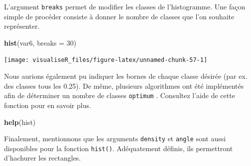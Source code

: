 \documentclass[]{article}
\newenvironment{Shaded}{\begin{snugshade}}{\end{snugshade}}
\newcommand{\CommentTok}[1]{\textcolor[rgb]{0.56,0.35,0.01}{\textit{#1}}}
\newcommand{\DataTypeTok}[1]{\textcolor[rgb]{0.13,0.29,0.53}{#1}}
\newcommand{\DecValTok}[1]{\textcolor[rgb]{0.00,0.00,0.81}{#1}}
\newcommand{\KeywordTok}[1]{\textcolor[rgb]{0.13,0.29,0.53}{\textbf{#1}}}
\newcommand{\NormalTok}[1]{#1}
\newcommand{\OtherTok}[1]{\textcolor[rgb]{0.56,0.35,0.01}{#1}}
\begin{document}
\begin{Shaded}
\end{Shaded}

L'argument \texttt{breaks} permet de modifier les classes de l'histogramme. Une façon
simple de procéder consiste à donner le nombre de classes que l'on souhaite
représenter.

\begin{Shaded}
\begin{Highlighting}[]
\KeywordTok{hist}\NormalTok{(var6, }\DataTypeTok{breaks =} \DecValTok{30}\NormalTok{)}
\end{Highlighting}
\end{Shaded}

\begin{center}\texttt{[image: visualiseR\_files/figure-latex/unnamed-chunk-57-1]} \end{center}

Nous aurions également pu indiquer les bornes de chaque classe désirée (par ex.
des classes tous les 0.25). De même, plusieurs algorithmes ont été implémentés
afin de déterminer un nombre de classes \texttt{optimum} . Consultez l'aide de cette
fonction pour en savoir plus.

\begin{Shaded}
\begin{Highlighting}[]
\KeywordTok{help}\NormalTok{(hist)}
\end{Highlighting}
\end{Shaded}

Finalement, mentionnons que les arguments \texttt{density} et \texttt{angle} sont aussi disponibles pour la fonction \texttt{hist()}. Adéquatement définis, ils permettront d'hachurer les rectangles.
\end{document}
